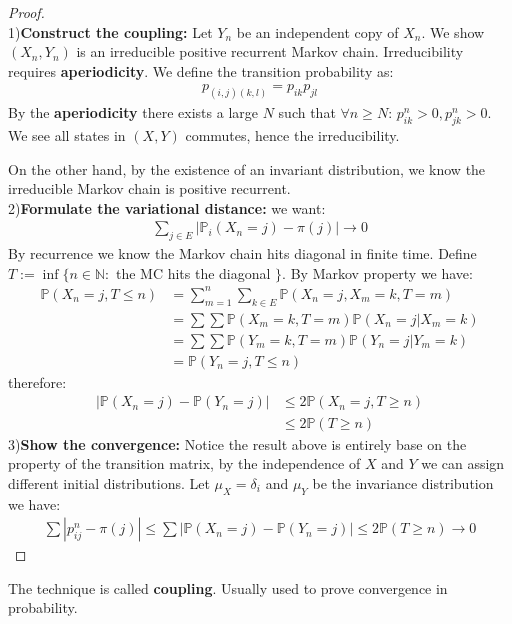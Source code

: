 \begin{proof}
\quad\\
1)\textbf{Construct the coupling:} Let $Y_n$ be an independent copy of $X_n$. We show $(X_n, Y_n)$ is an irreducible positive recurrent Markov chain. Irreducibility requires \textbf{aperiodicity}. We define the transition probability as:
\begin{align*}
	p_{(i,j)(k,l)} = p_{ik} p_{jl}
\end{align*}
By the \textbf{aperiodicity} there exists a large $N$ such that $\forall n \ge N$: $p_{ik}^n > 0, p_{jk}^n >0$. We see all states in $(X, Y)$ commutes, hence the irreducibility. \par 
On the other hand, by the existence of an invariant distribution, we know the irreducible Markov chain is positive recurrent.\\
2)\textbf{Formulate the variational distance:} we want:
\begin{align*}
	\sum_{j \in E} |\mathbb{P}_i(X_n = j) - \pi(j)| \rightarrow 0
\end{align*}
By recurrence we know the Markov chain hits diagonal in finite time. Define $T:= \inf\{n\in \mathbb{N}:$ the MC hits the diagonal $\}$. By Markov property we have:
\begin{align*}
	\mathbb{P}(X_n = j, T \le n) &= \sum_{m = 1}^n \sum_{k \in E} \mathbb{P}(X_n = j, X_m = k, T = m)\\
	&= \sum\sum \mathbb{P}(X_m = k, T = m)\mathbb{P}(X_n = j|X_m = k)\\
	&= \sum\sum \mathbb{P}(Y_m = k, T = m)\mathbb{P}(Y_n = j|Y_m = k)\\
	&= \mathbb{P}(Y_n = j, T \le n)
\end{align*}
therefore:
\begin{align*}
	|\mathbb{P}(X_n = j) - \mathbb{P}(Y_n = j)| &\le 2 \mathbb{P}(X_n = j, T\ge n) \\
	 &\le 2 \mathbb{P}(T \ge n)
\end{align*}
3)\textbf{Show the convergence: }Notice the result above is entirely base on the property of the transition matrix, by the independence of $X$ and $Y$ we can assign different initial distributions. Let $\mu_X = \delta_i $ and $\mu_Y$ be the invariance distribution we have:
\begin{align*}
	\sum|p_{ij}^n - \pi(j)| \le \sum |\mathbb{P}(X_n = j) - \mathbb{P}(Y_n = j)| \le 2\mathbb{P}(T \ge n) \rightarrow 0
\end{align*}
\end{proof}
\begin{remark}
The technique is called \textbf{coupling}. Usually used to prove convergence in probability.	
\end{remark}



